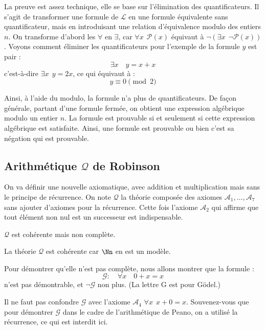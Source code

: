 \documentclass[11pt,class=report,crop=false]{standalone}
\begin{document}
La preuve est assez technique, elle se base sur l'\og{}élimination des quantificateurs\fg{}. Il s'agit de transformer une formule de $\mathcal{L}$ en une formule équivalente sans quantificateur, mais en introduisant une relation d'équivalence modulo des entiers $n$.
On transforme d'abord les $\forall$ en $\exists$, car \og$\forall x \ \ \mathcal{P}(x)$\fg{} équivaut à \og$\lnot(\exists x \ \ \lnot \mathcal{P}(x))$\fg. Voyons comment éliminer les quantificateurs pour l'exemple de la formule \og{}$y$ est pair\fg{} :
\[ \exists x \quad y=x+x \]
c'est-à-dire $\exists x \ \ y=2x$, ce qui équivaut à :
\[ y \equiv 0 \pmod 2 \]

Ainsi, à l'aide du modulo, la formule n'a plus de quantificateurs. 
De façon générale, partant d'une formule fermée, on obtient une expression algébrique modulo un entier $n$.
La formule est prouvable si et seulement si cette expression algébrique est satisfaite. 
Ainsi, une formule est prouvable ou bien c'est sa négation qui est prouvable.



\subsection{Arithmétique $\mathcal{Q}$ de Robinson}


On va définir une nouvelle axiomatique, avec addition et multiplication mais sans le principe de récurrence. On note $\mathcal{Q}$ la théorie composée des axiomes $\mathcal{A}_1, \dots, \mathcal{A}_7$ sans ajouter d'axiomes pour la récurrence. Cette fois l'axiome $\mathcal{A}_2$ qui affirme que tout élément non nul est un successeur est indispensable.

\begin{theoreme}
	$\mathcal{Q}$ est cohérente mais non complète.
\end{theoreme}

La théorie $\mathcal{Q}$ est cohérente car $\Nn$ en est un modèle.

Pour démontrer qu'elle n'est pas complète, nous allons montrer que la formule :
\[ \mathcal{G} : \quad \forall x \quad 0+x=x \]
n'est pas démontrable, et $\lnot \mathcal{G}$ non plus. (La lettre G est pour \og{}Gödel\fg{}.)

Il ne faut pas confondre $\mathcal{G}$ avec l'axiome $\mathcal{A}_4$ \og{}$\forall x \ \  x+0=x$\fg{}. Souvenez-vous que pour démontrer $\mathcal{G}$ dans le cadre de l'arithmétique de Peano, on a utilisé la récurrence, ce qui est interdit ici.
\end{document}
